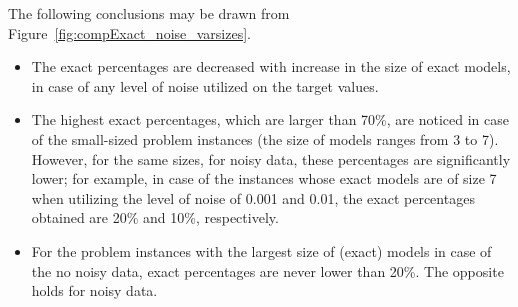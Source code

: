 \documentclass[a4paper,12pt]{elsarticle}
\begin{document}
The  following conclusions may be drawn from Figure~\ref{fig:compExact_noise_varsizes}.
\begin{itemize}
	\item The exact percentages are decreased with increase in  the size of exact models, in case of any level of noise utilized on the target values.  %
	\item The highest exact percentages, which are larger than 70\%, are noticed in case of the small-sized problem instances  (the size of models ranges from 3 to 7). However, for the same sizes, for noisy data, these percentages are significantly lower; for example, in case of the instances whose exact models are of size 7 when utilizing the level of noise of 0.001 and 0.01, the exact percentages obtained are 20\% and 10\%, respectively. 
	
	\item   For the problem instances with the largest size of (exact) models in case of the no noisy data, exact percentages are never lower than 20\%. The opposite holds for noisy data. 
\end{itemize}
\end{document}
